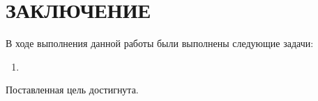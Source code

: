 \section*{\large ЗАКЛЮЧЕНИЕ}

В ходе выполнения данной работы были выполнены следующие задачи:
\begin{enumerate}
    \item 
\end{enumerate}


Поставленная цель достигнута.